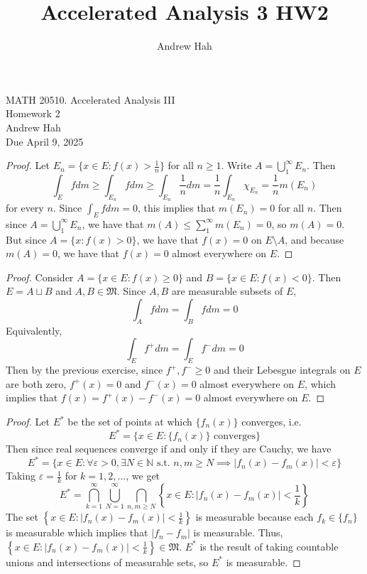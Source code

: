 \documentclass[11pt]{article}
\title{Accelerated Analysis 3 HW2}
\author{Andrew Hah}
\let\eps\varepsilon
\begin{document}
\pagestyle{plain}
\begin{center}
{\Large MATH 20510. Accelerated Analysis III} \\
{\Large Homework 2} \\
\vspace{.2in}  
Andrew Hah \\
Due April 9, 2025
\end{center}

\begin{exercise}{11.1}
    \begin{proof}
        Let $E_n = \{ x \in E : f(x) > \frac{1}{n} \}$ for all $n \ge 1$. Write $A = \bigcup_1^\infty E_n$. Then $$\int_E f dm \ge \int_{E_n} f dm \ge \int_{E_n} \frac{1}{n} dm = \frac{1}{n} \int_{E_n} \chi_{E_n} =  \frac{1}{n} m(E_n)$$ for every $n$. Since $\int_E f dm = 0$, this implies that $m(E_n) = 0$ for all $n$. Then since $A = \bigcup_1^\infty E_n$, we have that $m(A) \le \sum_1^\infty m(E_n) = 0$, so $m(A) = 0$. But since $A = \{ x : f(x) > 0 \}$, we have that $f(x) = 0$ on $E \setminus A$, and because $m(A) = 0$, we have that $f(x) = 0$ almost everywhere on $E$. 
    \end{proof}
\end{exercise}

\begin{exercise}{11.2}
    \begin{proof}
        Consider $A = \{ x \in E : f(x) \ge 0 \}$ and $B = \{ x \in E : f(x) < 0 \}$. Then $E = A \sqcup B$ and $A, B \in \mathfrak{M}$. Since $A, B$ are measurable subsets of $E$, $$\int_A f dm = \int_B f dm = 0$$ Equivalently, $$\int_E f^+ dm = \int_E f^- dm = 0$$ Then by the previous exercise, since $f^+, f^- \ge 0$ and their Lebesgue integrals on $E$ are both zero, $f^+ (x) = 0$ and $f^-(x) = 0$ almost everywhere on $E$, which implies that $f(x) = f^+ (x) - f^-(x) = 0$ almost everywhere on $E$. 
    \end{proof}
\end{exercise}

\begin{exercise}{11.3}
    \begin{proof}
        Let $E^*$ be the set of points at which $\{ f_n (x) \}$ converges, i.e.
        $$E^* = \{ x \in E : \{ f_n(x) \} \text{ converges} \} $$ Then since real sequences converge if and only if they are Cauchy, we have $$E^* = \{ x \in E : \forall \eps > 0, \exists N \in \mathbb{N} \text{ s.t. } n, m \ge N \implies |f_n(x) - f_m(x)| < \eps \}$$ Taking $\eps = \frac{1}{k}$ for $k = 1, 2, \dots$, we get $$E^* = \bigcap_{k = 1}^\infty \bigcup_{N = 1}^\infty \bigcap_{n, m \ge N} \left \{ x \in E : |f_n(x) - f_m(x)| < \frac{1}{k} \right \}$$ The set $\left \{ x \in E : |f_n(x) - f_m(x)| < \frac{1}{k} \right \}$ is measurable because each $f_k \in \{ f_n \}$ is measurable which implies that $|f_n - f_m|$ is measurable. Thus, $\left \{ x \in E : |f_n(x) - f_m(x)| < \frac{1}{k} \right \} \in \mathfrak{M}$. $E^*$ is the result of taking countable unions and intersections of measurable sets, so $E^*$ is measurable.
    \end{proof}
\end{exercise}
\end{document}
